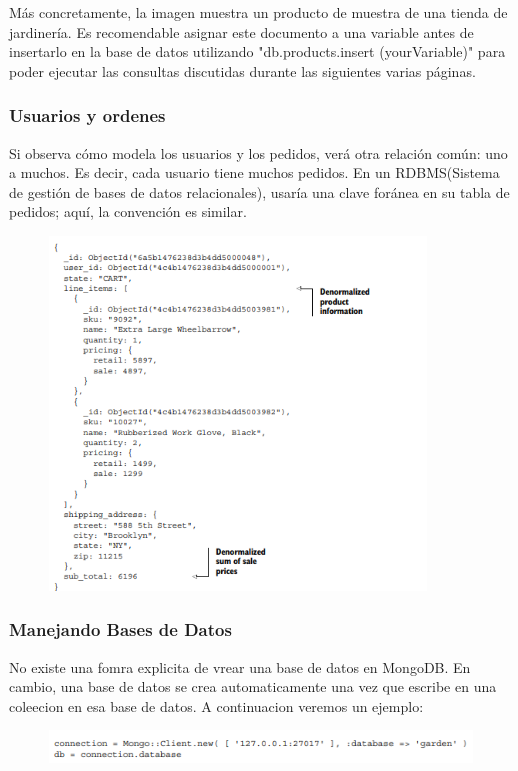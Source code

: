 \documentclass[preprint,12pt]{elsarticle}
\begin{document}
\cite{ecured}
Más concretamente, la imagen muestra un producto de muestra de una tienda de jardinería. Es recomendable asignar este documento a una variable antes de insertarlo en la base de datos utilizando
"db.products.insert (yourVariable)" para poder ejecutar las consultas discutidas durante las
siguientes varias páginas.
\subsubsection{\textbf{Usuarios y ordenes}}
Si observa cómo modela los usuarios y los pedidos, verá otra relación común: uno a muchos. Es decir, cada usuario tiene muchos pedidos. En un RDBMS(Sistema de gestión de bases de datos relacionales), usaría una clave foránea en su tabla de pedidos; aquí, la convención es similar.
\begin{figure}[htb]
	\begin{center}
		\includegraphics[width=10cm]{./IMAGENES/mongodb2} %
	\end{center}
\end{figure}
\subsubsection{\textbf{Manejando Bases de Datos}}
No existe una fomra explicita de vrear una base de datos en MongoDB. En cambio, una base de datos se crea automaticamente una vez que escribe en una coleecion en esa base de datos. A continuacion veremos un ejemplo:
\begin{figure}[htb]
	\begin{center}
		\includegraphics[width=15cm]{./IMAGENES/mongodb3} %
	\end{center}
\end{figure}
\end{document}
